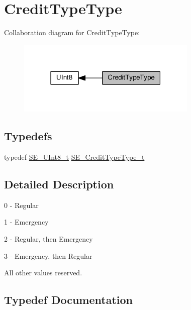 \hypertarget{group__CreditTypeType}{}\section{Credit\+Type\+Type}
\label{group__CreditTypeType}
Collaboration diagram for Credit\+Type\+Type\+:\nopagebreak
\begin{figure}[H]
\begin{center}
\leavevmode
\includegraphics[width=243pt]{group__CreditTypeType}
\end{center}
\end{figure}
\subsection*{Typedefs}
\begin{DoxyCompactItemize}
\item 
typedef \hyperlink{group__UInt8_gaf7c365a1acfe204e3a67c16ed44572f5}{S\+E\+\_\+\+U\+Int8\+\_\+t} \hyperlink{group__CreditTypeType_ga5a63742e5c65087df17ed6ad8f420b5e}{S\+E\+\_\+\+Credit\+Type\+Type\+\_\+t}
\end{DoxyCompactItemize}


\subsection{Detailed Description}
0 -\/ Regular

1 -\/ Emergency

2 -\/ Regular, then Emergency

3 -\/ Emergency, then Regular

All other values reserved. 

\subsection{Typedef Documentation}
\mbox{\label{group__CreditTypeType_ga5a63742e5c65087df17ed6ad8f420b5e}} 

